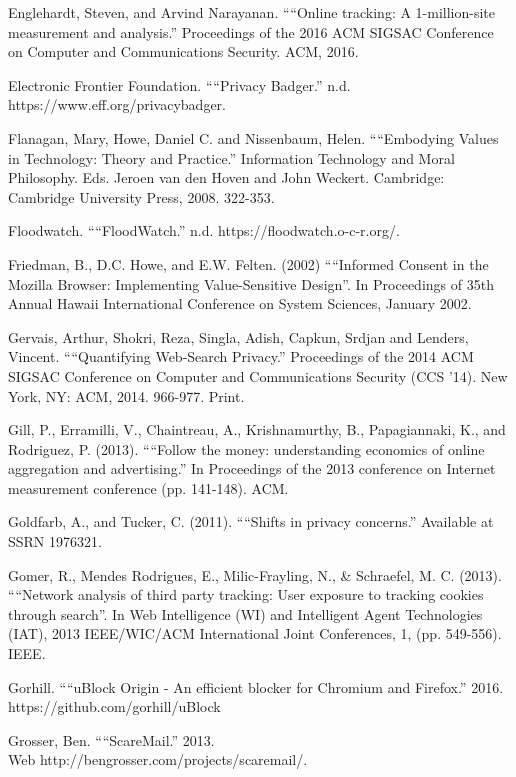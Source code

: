 \documentclass[conference]{IEEEtran}
\begin{document}
\begin{thebibliography}{99}
 Englehardt, Steven, and Arvind Narayanan. ““Online tracking: A 1-million-site measurement and analysis.” Proceedings of the 2016 ACM SIGSAC Conference on Computer and Communications Security. ACM, 2016.

 Electronic Frontier Foundation. ““Privacy Badger.” n.d. https://www.eff.org/privacybadger.

 Flanagan, Mary, Howe, Daniel C. and Nissenbaum, Helen. ““Embodying Values in Technology: Theory and Practice.” Information Technology and Moral Philosophy. Eds. Jeroen van den Hoven and John Weckert. Cambridge: Cambridge University Press, 2008. 322-353.

 Floodwatch. ““FloodWatch.” n.d. https://floodwatch.o-c-r.org/.

 Friedman, B., D.C. Howe, and E.W. Felten. (2002) ““Informed Consent in the Mozilla Browser: Implementing Value-Sensitive Design”. In Proceedings of 35th Annual Hawaii International Conference on System Sciences, January 2002.

 Gervais, Arthur, Shokri, Reza, Singla, Adish, Capkun, Srdjan and Lenders, Vincent. ““Quantifying Web-Search Privacy.” Proceedings of the 2014 ACM SIGSAC Conference on Computer and Communications Security (CCS '14). New York, NY: ACM, 2014. 966-977. Print.

 Gill, P., Erramilli, V., Chaintreau, A., Krishnamurthy, B., Papagiannaki, K., and Rodriguez, P. (2013). ““Follow the money: understanding economics of online aggregation and advertising.” In Proceedings of the 2013 conference on Internet measurement conference (pp. 141-148). ACM.

 Goldfarb, A., and Tucker, C. (2011). ““Shifts in privacy concerns.” Available at SSRN 1976321.

 Gomer, R., Mendes Rodrigues, E., Milic-Frayling, N., \& Schraefel, M. C. (2013). ““Network analysis of third party tracking: User exposure to tracking cookies through search”. In Web Intelligence (WI) and Intelligent Agent Technologies (IAT), 2013 IEEE/WIC/ACM International Joint Conferences, 1, (pp. 549-556). IEEE.

 Gorhill. ““uBlock Origin - An efficient blocker for Chromium and Firefox.” 2016. https://github.com/gorhill/uBlock

 Grosser, Ben. ““ScareMail.” 2013.\\ Web http://bengrosser.com/projects/scaremail/.


\end{thebibliography}
\end{document}
